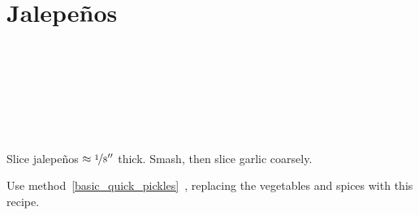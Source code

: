 \section{Jalepe\~{n}os}


\begin{ingredientcolumns}[1]
	\begin{ingredientblock}
		\\
		\\
		\\
		\\
		\\
		\\
	\end{ingredientblock}
\end{ingredientcolumns}


\begin{preparation}
\item Slice jalepe\~{n}os $\approx \nicefrac{1}{8}''$ thick.
	Smash, then slice garlic coarsely.

\item Use method~\ref{basic_quick_pickles}~, replacing the vegetables and spices with this recipe.
\end{preparation}


\recipeend%
